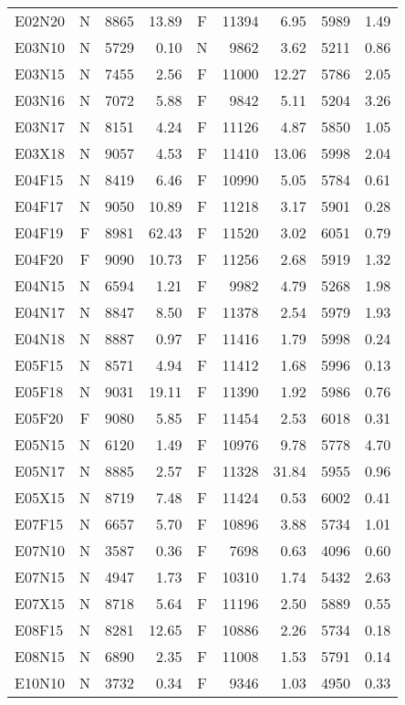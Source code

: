 \documentclass[ppgc,tese,english,formais,babel]{iiufrgs}
\begin{document}
\begin{spacing}{1.0}
\begin{table}[H]
\begin{tabular}{lcrrcrrrr}
E02N20 & N & 8865 & 13.89 & F & 11394 & 6.95 & 5989 & 1.49 \\
E03N10 & N & 5729 & 0.10 & N & 9862 & 3.62 & 5211 & 0.86 \\
E03N15 & N & 7455 & 2.56 & F & 11000 & 12.27 & 5786 & 2.05 \\
E03N16 & N & 7072 & 5.88 & F & 9842 & 5.11 & 5204 & 3.26 \\
E03N17 & N & 8151 & 4.24 & F & 11126 & 4.87 & 5850 & 1.05 \\
E03X18 & N & 9057 & 4.53 & F & 11410 & 13.06 & 5998 & 2.04 \\
E04F15 & N & 8419 & 6.46 & F & 10990 & 5.05 & 5784 & 0.61 \\
E04F17 & N & 9050 & 10.89 & F & 11218 & 3.17 & 5901 & 0.28 \\
E04F19 & F & 8981 & 62.43 & F & 11520 & 3.02 & 6051 & 0.79 \\
E04F20 & F & 9090 & 10.73 & F & 11256 & 2.68 & 5919 & 1.32 \\
E04N15 & N & 6594 & 1.21 & F & 9982 & 4.79 & 5268 & 1.98 \\
E04N17 & N & 8847 & 8.50 & F & 11378 & 2.54 & 5979 & 1.93 \\
E04N18 & N & 8887 & 0.97 & F & 11416 & 1.79 & 5998 & 0.24 \\
E05F15 & N & 8571 & 4.94 & F & 11412 & 1.68 & 5996 & 0.13 \\
E05F18 & N & 9031 & 19.11 & F & 11390 & 1.92 & 5986 & 0.76 \\
E05F20 & F & 9080 & 5.85 & F & 11454 & 2.53 & 6018 & 0.31 \\
E05N15 & N & 6120 & 1.49 & F & 10976 & 9.78 & 5778 & 4.70 \\
E05N17 & N & 8885 & 2.57 & F & 11328 & 31.84 & 5955 & 0.96 \\
E05X15 & N & 8719 & 7.48 & F & 11424 & 0.53 & 6002 & 0.41 \\
E07F15 & N & 6657 & 5.70 & F & 10896 & 3.88 & 5734 & 1.01 \\
E07N10 & N & 3587 & 0.36 & F & 7698 & 0.63 & 4096 & 0.60 \\
E07N15 & N & 4947 & 1.73 & F & 10310 & 1.74 & 5432 & 2.63 \\
E07X15 & N & 8718 & 5.64 & F & 11196 & 2.50 & 5889 & 0.55 \\
E08F15 & N & 8281 & 12.65 & F & 10886 & 2.26 & 5734 & 0.18 \\
E08N15 & N & 6890 & 2.35 & F & 11008 & 1.53 & 5791 & 0.14 \\
E10N10 & N & 3732 & 0.34 & F & 9346 & 1.03 & 4950 & 0.33 \\

\end{tabular}
\end{table}
\end{spacing}
\end{document}

